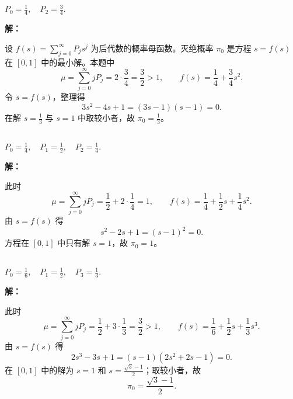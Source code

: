 \documentclass[12pt,a4paper]{article}
\begin{document}
\subsection{}

$P_0=\frac14,\quad P_2=\frac34$.

\begin{answerbox}
\textbf{解：}

设 $f(s)=\sum_{j=0}^{\infty}P_j s^j$ 为后代数的概率母函数。灭绝概率 $\pi_0$ 是方程 $s=f(s)$ 在 $[0,1]$ 中的最小解。本题中
\[
\mu=\sum_{j=0}^{\infty}jP_j=2\cdot\frac34=\frac32>1,
\qquad f(s)=\frac14+\frac34s^2.
\]
令 $s=f(s)$，整理得
\[
3s^2-4s+1=(3s-1)(s-1)=0.
\]
在解 $s=\frac13$ 与 $s=1$ 中取较小者，故 $\pi_0=\frac13$。
\end{answerbox}

\subsection{}

$P_0=\frac14,\quad P_1=\frac12,\quad P_2=\frac14$.

\begin{answerbox}
\textbf{解：}

此时
\[
\mu=\sum_{j=0}^{\infty}jP_j=\frac12+2\cdot\frac14=1,
\qquad f(s)=\frac14+\frac12s+\frac14s^2.
\]
由 $s=f(s)$ 得
\[
s^2-2s+1=(s-1)^2=0.
\]
方程在 $[0,1]$ 中只有解 $s=1$，故 $\pi_0=1$。
\end{answerbox}

\subsection{}

$P_0=\frac16,\quad P_1=\frac12,\quad P_3=\frac13$.

\begin{answerbox}
\textbf{解：}

此时
\[
\mu=\sum_{j=0}^{\infty}jP_j=\frac12+3\cdot\frac13=\frac32>1,
\qquad f(s)=\frac16+\frac12s+\frac13s^3.
\]
由 $s=f(s)$ 得
\[
2s^3-3s+1=(s-1)(2s^2+2s-1)=0.
\]
在 $[0,1]$ 中的解为 $s=1$ 和 $s=\frac{\sqrt3-1}{2}$；取较小者，故
\[
\pi_0=\frac{\sqrt3-1}{2}.
\]
\end{answerbox}
\end{document}
